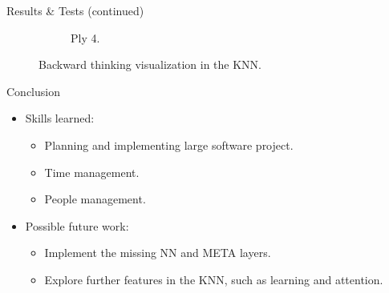 \documentclass[final]{beamer} %
\begin{document}
\begin{frame}
\begin{columns}
\begin{column}{.35\textwidth}
{\begin{block}{Results \& Tests (continued)}
\begin{figure}[!htb]
\begin{subfigure}[!htb]{0.24\columnwidth}
							\caption{Ply 4.}
						\end{subfigure}
						\caption{Backward thinking visualization in the KNN.}
					\end{figure}
				\end{block}
				\begin{block}{Conclusion}
					\begin{itemize}
						\item Skills learned:
						\begin{itemize}
							\item Planning and implementing large software project.
							\item Time management.
							\item People management.
						\end{itemize}
					
						\item Possible future work:
						\begin{itemize}
							\item Implement the missing NN and META layers.
							\item Explore further features in the KNN, such as learning and attention.
						\end{itemize}
					\end{itemize}
				\end{block}
			}
			\end{column}
		\end{columns}
	\end{frame}
\end{document}
